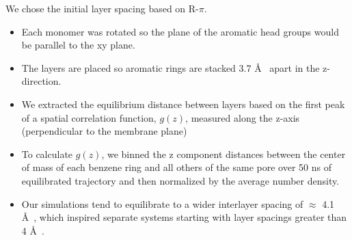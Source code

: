 \documentclass{article}
\newcommand{\angstrom}{\textup{\AA}}
\begin{document}
  We chose the initial layer spacing based on R-$\pi$.
  \begin{itemize}  
    \item Each monomer was rotated so the plane of the aromatic head groups would
    be parallel to the xy plane.
    \item The layers are placed so aromatic rings are stacked 3.7 \angstrom~
    apart in the z-direction.
    \item We extracted the equilibrium distance between layers based on the first
    peak of a spatial correlation function, $g(z)$, measured along the z-axis (perpendicular to 
    the membrane plane)
    \item To calculate $g(z)$, we binned the z component distances between 
    the center of mass of each benzene ring and all others of the same pore 
    over 50 ns of equilibrated trajectory and then normalized by the average
    number density.
    \item Our simulations tend to equilibrate to a wider interlayer spacing of
    $\approx$ 4.1 \angstrom~, which inspired separate systems starting with layer 
    spacings greater than 4 \angstrom~.
  \end{itemize}
\end{document}
